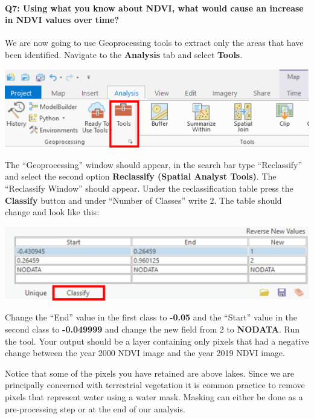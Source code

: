 \documentclass[
]{book}
\begin{document}
\hypertarget{q7-using-what-you-know-about-ndvi-what-would-cause-an-increase-in-ndvi-values-over-time}{%
\paragraph*{Q7: Using what you know about NDVI, what would cause an increase in NDVI values over time?}\label{q7-using-what-you-know-about-ndvi-what-would-cause-an-increase-in-ndvi-values-over-time}}

We are now going to use Geoprocessing tools to extract only the areas that have been identified. Navigate to the \textbf{Analysis} tab and select \textbf{Tools}.

\begin{center}\includegraphics[width=0.6\linewidth]{images/07-analysis-tools} \end{center}

The ``Geoprocessing'' window should appear, in the search bar type ``Reclassify'' and select the second option \textbf{Reclassify (Spatial Analyst Tools)}. The ``Reclassify Window'' should appear. Under the reclassification table press the \textbf{Classify} button and under ``Number of Classes'' write 2. The table should change and look like this:

\begin{center}\includegraphics[width=0.5\linewidth]{images/07-classify-table} \end{center}

Change the ``End'' value in the first class to \textbf{-0.05} and the ``Start'' value in the second class to \textbf{-0.049999} and change the new field from 2 to \textbf{NODATA}. Run the tool. Your output should be a layer containing only pixels that had a negative change between the year 2000 NDVI image and the year 2019 NDVI image.

Notice that some of the pixels you have retained are above lakes. Since we are principally concerned with terrestrial vegetation it is common practice to remove pixels that represent water using a water mask. Masking can either be done as a pre-processing step or at the end of our analysis.
\end{document}
